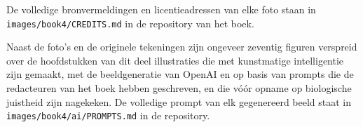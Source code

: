 De volledige bronvermeldingen en licentieadressen van elke foto staan
in \texttt{images/\allowbreak book4/\allowbreak CREDITS.md} in de repository van het boek.

\bigskip
Naast de foto's en de originele tekeningen zijn ongeveer zeventig
figuren verspreid over de hoofdstukken van dit deel illustraties die
met kunstmatige intelligentie zijn gemaakt, met de beeldgeneratie van
OpenAI en op basis van prompts die de redacteuren van het boek hebben
geschreven, en die vóór opname op biologische juistheid zijn
nagekeken. De volledige prompt van elk gegenereerd beeld staat in
\texttt{images/\allowbreak book4/\allowbreak ai/\allowbreak PROMPTS.md} in de repository.
\par\endgroup
\clearpage
